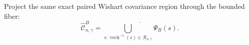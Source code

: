 Project the same exact paired Wishart covariance region through the bounded fiber:
\[
\widehat{\mathcal C}^{B}_{n,\gamma}
 =\overline{\bigcup_{s:\operatorname{vech}^{-1}(s)
 \in\mathcal R_{n,\gamma}}\Psi_B(s)}.
\]